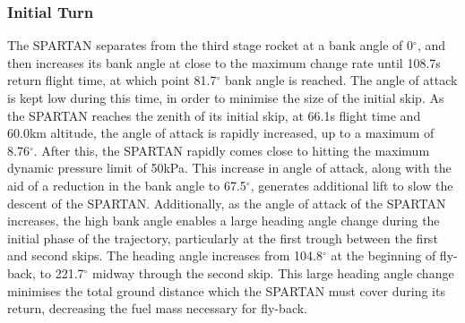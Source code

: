 \subsubsection{ Initial Turn}
The SPARTAN separates from the third stage rocket at a bank angle of 0$^\circ$, and then increases its bank angle at close to the maximum change rate until 108.7s return flight time, at which point 81.7$^\circ$ bank angle is reached.
The angle of attack is kept low during this time, in order to minimise the size of the initial skip. 
As the SPARTAN reaches the zenith of its initial skip, at 66.1s flight time and 60.0km altitude, the angle of attack is rapidly increased, up to a maximum of 8.76$^\circ$. 
 After this, the SPARTAN rapidly comes close to hitting the maximum dynamic pressure limit of 50kPa. This increase in angle of attack, along with the aid of a reduction in the bank angle to 67.5$^\circ$, generates additional lift to slow the descent of the SPARTAN. 
Additionally, as the angle of attack of the SPARTAN increases, the high bank angle enables a large heading angle change during the initial phase of the trajectory, particularly at the first trough between the first and second skips. The heading angle increases from 104.8$^\circ$ at the beginning of fly-back, to 221.7$^\circ$ midway through the second skip. This large heading angle change minimises the total ground distance which the SPARTAN must cover during its return, decreasing the fuel mass necessary for fly-back. 

